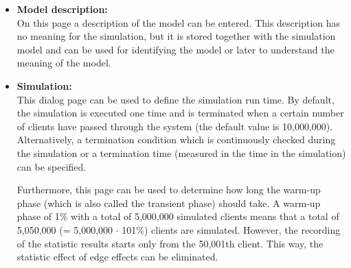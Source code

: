 \documentclass{svmono}
\begin{document}
\begin{itemize}
\item
\textbf{Model description:}\\
On this page a description of the model can be entered. This description has no meaning for the simulation, but it is stored together with the simulation model and can be used for identifying the model or later to understand the meaning of the model.
\item
\textbf{Simulation:}\\
This dialog page can be used to define the simulation run time. By default, the simulation is executed one time and is terminated when a certain number of clients have passed through the system (the default value is 10,000,000). Alternatively, a termination condition which is continuously checked during the simulation or a termination time (measured in the time in the simulation) can be specified.

Furthermore, this page can be used to determine how long the warm-up phase (which is also called the transient phase) should take. A warm-up phase of 1\% with a total of 5,000,000 simulated clients means that a total of 5,050,000 (= 5,000,000 $\cdot$ 101\%) clients are simulated. However, the recording of the statistic results starts only from the 50,001th client. This way, the statistic effect of edge effects can be eliminated.


\end{itemize}
\end{document}
